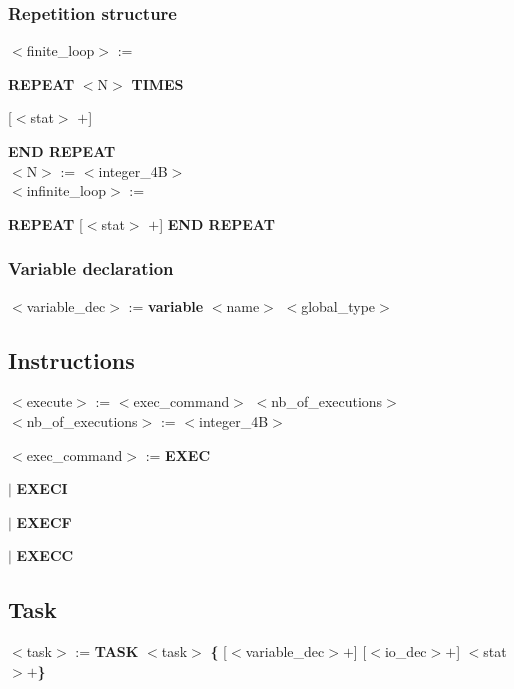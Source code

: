 \documentclass[12pt]{article}
\begin{document}
\begin{onecolumn}
 

\subsubsection{Repetition structure}

\noindent $<$finite\_loop$>$ := 

\textbf{REPEAT} $<$N$>$ \textbf{TIMES} 

[$<$stat$>$ $+$]

\textbf{END REPEAT}\\

$<$N$>$ := $<$integer\_4B$>$\\

\noindent $<$infinite\_loop$>$ := 

\textbf{REPEAT} [$<$stat$>$ $+$]  \textbf{END REPEAT}

\subsubsection{Variable declaration}

\noindent $<$variable\_dec$>$ := \textbf{variable} $<$name$>$ $<$global\_type$>$\\




\subsection{Instructions}

$<$execute$>$ := $<$exec\_command$>$ $<$nb\_of\_executions$>$\\

$<$nb\_of\_executions$>$ := $<$integer\_4B$>$

$<$exec\_command$>$ := \textbf{EXEC}

\indent \indent \indent \indent \indent \indent \indent $|$ \textbf{EXECI}

\indent \indent \indent \indent \indent \indent \indent $|$ \textbf{EXECF}

\indent \indent \indent \indent \indent \indent \indent $|$ \textbf{EXECC}




\subsection{Task}

\noindent $<$task$>$ := \textbf{TASK} $<$task$>$ \textbf{\{} [$<$variable\_dec$>$$+$] [$<$io\_dec$>$$+$] $<$stat$>$$+$\textbf{\}} \\


\end{onecolumn}
\end{document}
